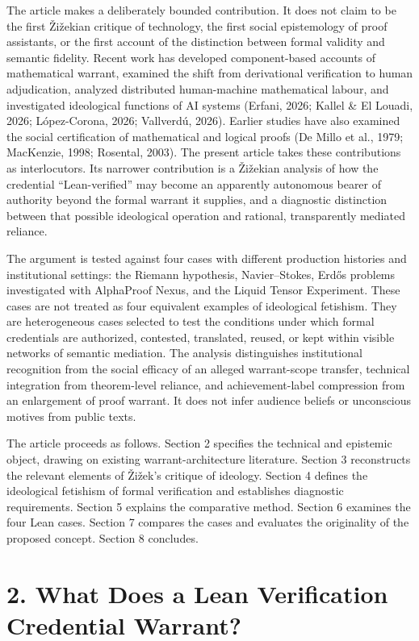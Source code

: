 \documentclass[sn-apa]{sn-jnl}
\begin{document}
The article makes a deliberately bounded contribution. It does not claim to be the first Žižekian critique of technology, the first social epistemology of proof assistants, or the first account of the distinction between formal validity and semantic fidelity. Recent work has developed component-based accounts of mathematical warrant, examined the shift from derivational verification to human adjudication, analyzed distributed human-machine mathematical labour, and investigated ideological functions of AI systems (Erfani, 2026; Kallel \& El Louadi, 2026; López-Corona, 2026; Vallverdú, 2026). Earlier studies have also examined the social certification of mathematical and logical proofs (De Millo et al., 1979; MacKenzie, 1998; Rosental, 2003). The present article takes these contributions as interlocutors. Its narrower contribution is a Žižekian analysis of how the credential “Lean-verified” may become an apparently autonomous bearer of authority beyond the formal warrant it supplies, and a diagnostic distinction between that possible ideological operation and rational, transparently mediated reliance.

The argument is tested against four cases with different production histories and institutional settings: the Riemann hypothesis, Navier–Stokes, Erdős problems investigated with AlphaProof Nexus, and the Liquid Tensor Experiment. These cases are not treated as four equivalent examples of ideological fetishism. They are heterogeneous cases selected to test the conditions under which formal credentials are authorized, contested, translated, reused, or kept within visible networks of semantic mediation. The analysis distinguishes institutional recognition from the social efficacy of an alleged warrant-scope transfer, technical integration from theorem-level reliance, and achievement-label compression from an enlargement of proof warrant. It does not infer audience beliefs or unconscious motives from public texts.

The article proceeds as follows. Section 2 specifies the technical and epistemic object, drawing on existing warrant-architecture literature. Section 3 reconstructs the relevant elements of Žižek’s critique of ideology. Section 4 defines the ideological fetishism of formal verification and establishes diagnostic requirements. Section 5 explains the comparative method. Section 6 examines the four Lean cases. Section 7 compares the cases and evaluates the originality of the proposed concept. Section 8 concludes.

\section{2. What Does a Lean Verification Credential Warrant?}
\end{document}
